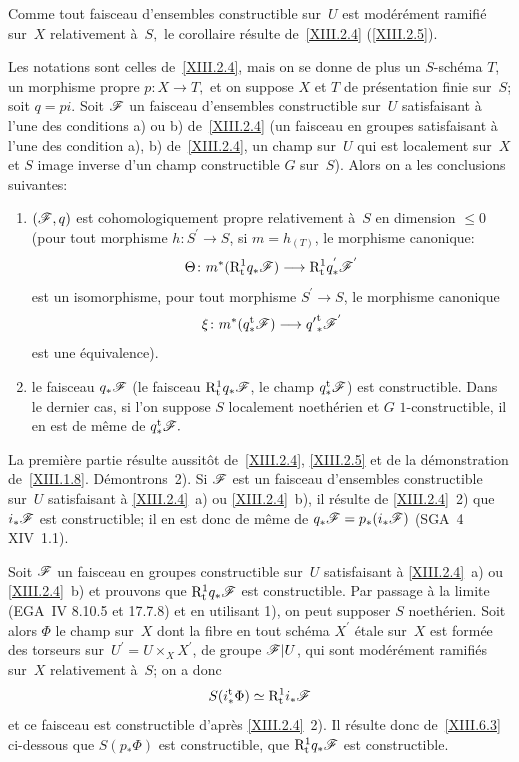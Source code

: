 Comme tout faisceau d'ensembles constructible sur~$U$ est
mod\'er\'ement ramifi\'e sur~$X$ relativement \`a~$S,$ le
corollaire r\'esulte de~\ref{XIII.2.4} (\resp \ref{XIII.2.5}).

\begin{corollaire}
\label{XIII.2.7}
Les notations sont celles de~\ref{XIII.2.4}, mais on se donne de plus
un $S$-sch\'ema $T$, un morphisme propre $p\colon X\to T,$
et on suppose $X$ et $T$ de pr\'esentation finie sur~$S$; soit
$q=pi$. Soit $\cal{ F}$ un faisceau d'ensembles constructible sur~$U$
satisfaisant \`a l'une des conditions \textup{a)} ou \textup{b)} de~\ref{XIII.2.4}
(\resp un faisceau en groupes satisfaisant \`a l'une des condition
\textup{a)}, \textup{b)} de~\ref{XIII.2.4}, \resp un champ sur~$U$ qui est localement sur~$X$ et $S$ image inverse d'un champ constructible $G$ sur~$S$). Alors
on a les conclusions suivantes:
\begin{enumerate}
\item[1)] $(\cal{ F},q)$ est cohomologiquement propre relativement \`a~$S$ en dimension $\leq 0$ (\resp pour tout morphisme $h\colon
S^{'}\to S$, si $m=h_{(T)}$, le morphisme canonique:
$$
\Theta\colon m^*(\R^1_{\tame}q_*\cal{ F})\to
\R^1_{\tame}q_*^{'}\cal{ F}^{'}
$$
est un isomorphisme, \resp pour tout morphisme $S^{'}\to S$,
le morphisme canonique
$$
\xi \colon m^*(q_*^{\tame}\cal{ F})\to
{q'}_*^{{\tame}}\cal{F}^{'}
$$
est une \'equivalence).
\item[2)] le faisceau $q_*\cal{ F}$ (\resp le faisceau
$\R_{\tame}^1q_*\cal{ F}$, \resp le champ $q_*^{\tame}\cal{ F}$)
est constructible. Dans le dernier cas, si l'on suppose $S$ localement
noeth\'erien et $G$ $1$-constructible, il en est de m\^eme de
$q_*^{\tame}\cal{ F}.$
\end{enumerate}
\end{corollaire}

La
premi\`ere partie r\'esulte aussit\^ot de~\ref{XIII.2.4},
\ref{XIII.2.5} et de la d\'emonstration
de~\ref{XIII.1.8}. D\'emontrons~2). Si $\cal{ F}$ est un faisceau
d'ensembles constructible sur~$U$ satisfaisant \`a \ref{XIII.2.4}~a)
ou \ref{XIII.2.4}~b), il r\'esulte de \ref{XIII.2.4}~2) que
$i_*\cal{ F}$ est constructible; il en est donc de m\^eme de
$q_*\cal{ F}=p_*(i_*\cal{ F})$ (SGA~4 XIV~1.1).

Soit $\cal{F}$ un faisceau en groupes constructible sur~$U$
satisfaisant \`a \ref{XIII.2.4}~a) ou \ref{XIII.2.4}~b) et prouvons
que $\R_{\tame}^1q_*\cal{ F}$ est constructible. Par passage \`a
la limite (EGA~IV 8.10.5 et 17.7.8) et en utilisant 1), on peut
supposer $S$ noeth\'erien. Soit alors $\Phi$ le champ sur~$X$ dont
la fibre en tout sch\'ema $X^{'}$ \'etale sur~$X$ est form\'ee
des torseurs sur~$U^{'}=U\times_{X}X^{'}$, de groupe $\cal{F}|U$, qui
sont mod\'er\'ement ramifi\'es sur~$X$ relativement \`a~$S$; on
a donc
$$
S(i_*^{\tame}\Phi)\simeq \R_{\tame}^1i_*\cal{ F}
$$
et ce faisceau est constructible d'apr\`es \ref{XIII.2.4}~2).
Il r\'esulte donc de~\ref{XIII.6.3} ci-dessous que $S(p_*\Phi)$
est constructible, \ie que $\R^1_{\tame}q_*\cal{ F}$ est
constructible.

